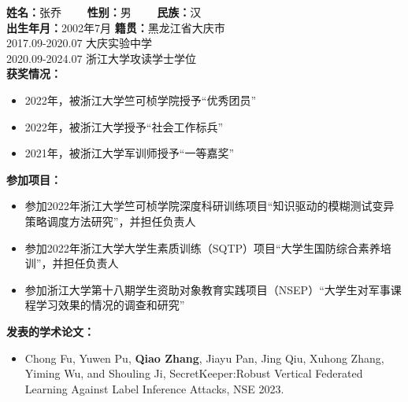 \cleardoublepage
{}
\textbf{姓名：}张乔  \ \ \ \ \textbf{性别：}男    \ \ \ \   \textbf{民族：}汉\\
\textbf{出生年月：}2002年7月  \textbf{籍贯：}黑龙江省大庆市\\
2017.09-2020.07   大庆实验中学 \\
2020.09-2024.07   浙江大学攻读学士学位\\
\textbf{获奖情况：}
\begin{itemize}
    \item 2022年，被浙江大学竺可桢学院授予“优秀团员”
    \item 2022年，被浙江大学授予“社会工作标兵”
    \item 2021年，被浙江大学军训师授予“一等嘉奖”
\end{itemize}
\textbf{参加项目：}
\begin{itemize}
    \item 参加2022年浙江大学竺可桢学院深度科研训练项目“知识驱动的模糊测试变异策略调度方法研究”，并担任负责人
    \item 参加2022年浙江大学大学生素质训练（SQTP）项目“大学生国防综合素养培训”，并担任负责人
    \item 参加浙江大学第十八期学生资助对象教育实践项目（NSEP）“大学生对军事课程学习效果的情况的调查和研究”
\end{itemize}
\textbf{发表的学术论文：}
\begin{itemize}
    \item Chong Fu, Yuwen Pu, \textbf{Qiao Zhang}, Jiayu Pan, Jing Qiu, Xuhong Zhang, Yiming Wu, and Shouling Ji, SecretKeeper:Robust Vertical Federated Learning Against Label Inference Attacks, NSE 2023.
\end{itemize}

